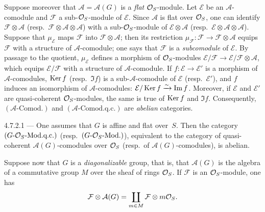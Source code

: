 {\renewcommand{\thefootnote}{(43)}}
Suppose moreover that \(\mathcal{A} = \mathcal{A}(G)\) is a \emph{flat}
\(\mathcal{O}_S\)-module. Let \(\mathcal{E}\) be an \(\mathcal{A}\)-comodule and
\(\mathcal{F}\) a sub-\(\mathcal{O}_S\)-module of \(\mathcal{E}\). Since \(\mathcal{A}\)
is flat over \(\mathcal{O}_S\), one can identify \(\mathcal{F} \otimes \mathcal{A}\)
(resp.\ \(\mathcal{F} \otimes \mathcal{A} \otimes \mathcal{A}\)) with a
sub-\(\mathcal{O}_S\)-module of \(\mathcal{E} \otimes \mathcal{A}\)
(resp.\ \(\mathcal{E} \otimes \mathcal{A} \otimes \mathcal{A}\)).
Suppose that \(\mu_{\mathcal{E}}\) maps \(\mathcal{F}\) into
\(\mathcal{F} \otimes \mathcal{A}\); then its restriction
\(\mu_{\mathcal{F}} \colon \mathcal{F} \to \mathcal{F} \otimes \mathcal{A}\)
equips \(\mathcal{F}\) with a structure of \(\mathcal{A}\)-comodule; one says
that \(\mathcal{F}\) is a \emph{subcomodule} of \(\mathcal{E}\).
By passage to the quotient, \(\mu_{\mathcal{E}}\) defines a morphism of
\(\mathcal{O}_S\)-modules
\(\mathcal{E}/\mathcal{F} \to \mathcal{E}/\mathcal{F} \otimes \mathcal{A}\),
which equips \(\mathcal{E}/\mathcal{F}\) with a structure of
\(\mathcal{A}\)-comodule. If \(f \colon \mathcal{E} \to \mathcal{E}'\) is a
morphism of \(\mathcal{A}\)-comodules, \(\operatorname{Ker} f\) (resp.\ \(\Im f\)) is a
sub-\(\mathcal{A}\)-comodule of \(\mathcal{E}\) (resp.\ \(\mathcal{E}'\)), and
\(f\) induces an isomorphism of \(\mathcal{A}\)-comodules:
\(\mathcal{E}/\operatorname{Ker} f \xrightarrow{\sim} \operatorname{Im} f\). Moreover, if \(\mathcal{E}\) and
\(\mathcal{E}'\) are quasi-coherent \(\mathcal{O}_S\)-modules, the same is true of
\(\operatorname{Ker} f\) and \(\Im f\). Consequently, \((\mathcal{A}\text{-}\mathrm{Comod.})\)
and \((\mathcal{A}\text{-}\mathrm{Comod.q.c.})\) are \emph{abelian}
categories.

\begin{corollary}{4.7.2.1}\label{I.4.7.2.1}
--- One assumes that \(G\) is affine and flat over~\(S\). Then the category
\((G\text{-}\mathcal{O}_S\text{-Mod.q.c.})\)
(resp.\ \((G\text{-}\mathcal{O}_S\text{-Mod.})\)), equivalent to the
category of quasi-coherent \(\mathcal{A}(G)\)-comodules over \(\mathcal{O}_S\)
(resp.\ of \(\mathcal{A}(G)\)-comodules), is abelian.
\end{corollary}

Suppose now that \(G\) is a \emph{diagonalizable} group, that is, that
\(\mathcal{A}(G)\) is the algebra of a commutative group \(M\) over the sheaf
of rings \(\mathcal{O}_S\). If \(\mathcal{F}\) is an \(\mathcal{O}_S\)-module, one has
\[
\mathcal{F} \otimes \mathcal{A}(G)
= \coprod_{m \in M} \mathcal{F} \otimes m\mathcal{O}_S.
\]

